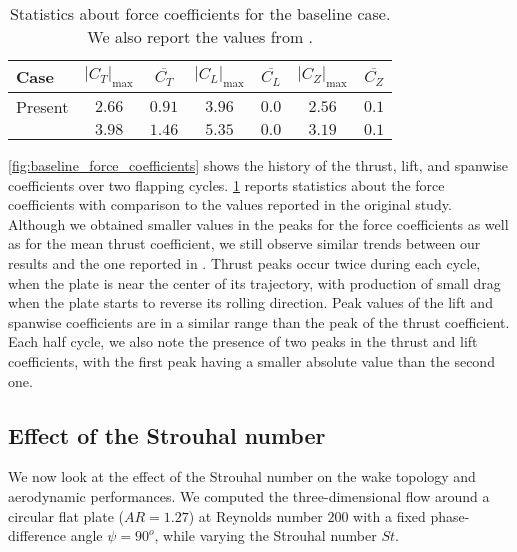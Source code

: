 \begin{table}
  \centering
  \begin{tabular}{lcccccc}
    \hline\hline
    Case & $\left| C_T \right|_\text{max}$ & $\overline{C_T}$ & $\left| C_L \right|_\text{max}$ & $\overline{C_L}$ & $\left| C_Z \right|_\text{max}$ & $\overline{C_Z}$ \\
    \hline
    Present & $2.66$ & $0.91$ & $3.96$ & $0.0$ & $2.56$ & $0.1$ \\
    \citet{li_dong_2016} & $3.98$ & $1.46$ & $5.35$ & $0.0$ & $3.19$ & $0.1$ \\
    \hline\hline
  \end{tabular}
  \caption{Statistics about force coefficients for the baseline case. We also report the values from \citet{li_dong_2016}.}
  \label{tab:baseline_force_coefficients}
\end{table}

\cref{fig:baseline_force_coefficients} shows the history of the thrust, lift, and spanwise coefficients over two flapping cycles.
\cref{tab:baseline_force_coefficients} reports statistics about the force coefficients with comparison to the values reported in the original study.
Although we obtained smaller values in the peaks for the force coefficients as well as for the mean thrust coefficient, we still observe similar trends between our results and the one reported in \citet{li_dong_2016}.
Thrust peaks occur twice during each cycle, when the plate is near the center of its trajectory, with production of small drag when the plate starts to reverse its rolling direction.
Peak values of the lift and spanwise coefficients are in a similar range than the peak of the thrust coefficient.
Each half cycle, we also note the presence of two peaks in the thrust and lift coefficients, with the first peak having a smaller absolute value than the second one.

\subsection{Effect of the Strouhal number}

We now look at the effect of the Strouhal number on the wake topology and aerodynamic performances.
We computed the three-dimensional flow around a circular flat plate ($AR = 1.27$) at Reynolds number $200$ with a fixed phase-difference angle $\psi = 90^o$, while varying the Strouhal number $St$.

